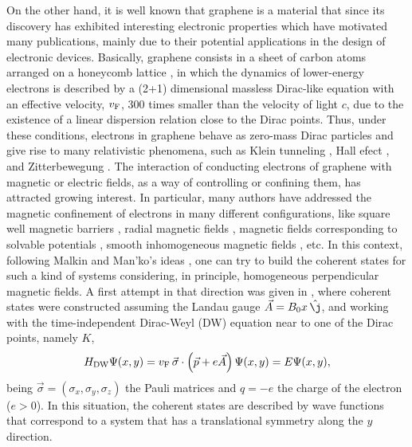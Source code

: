 \documentclass[aps,showpacs,showkeys]{revtex4}
\begin{document}
On the other hand, it is well known that graphene is a material that since its discovery has exhibited interesting electronic properties which have motivated many publications, mainly due to their potential applications in the design of electronic devices. Basically, graphene consists in a sheet of carbon atoms arranged on a honeycomb lattice \cite{ngmzd04,ztsk05,cngpn09}, in which the dynamics of lower-energy electrons is described by a (2+1) dimensional massless Dirac-like equation with an effective velocity, $v_{\rm F}$, 300 times smaller than the velocity of light $c$, due to the existence of a linear dispersion relation close to the Dirac points. Thus, under these conditions, electrons in graphene behave as zero-mass Dirac particles and give rise to many relativistic phenomena, such as Klein tunneling \cite{kng06}, Hall efect \cite{ngmzd04,cngpn09,s91}, and Zitterbewegung \cite{k06,rz07,rz08}. The interaction of conducting electrons of graphene with magnetic or electric fields, as a way of controlling or confining them, has attracted growing interest. In particular, many authors have addressed the magnetic confinement of electrons in many different configurations, like square well magnetic barriers \cite{dmdae07,dndm09}, radial magnetic fields \cite{gmr09}, magnetic fields corresponding to solvable potentials \cite{knn09,mf14}, smooth inhomogeneous magnetic fields \cite{rvp11,lara,dp16,cdmp16,ema17,rkb12,dnvhp17}, etc. In this context, following Malkin and Man'ko's ideas \cite{mm69}, one can try to build the coherent states for such a kind of systems considering, in principle, homogeneous perpendicular magnetic fields. A first attempt in that direction was given in \cite{df17}, where coherent states were constructed assuming the Landau gauge $\vec{A}=B_0x\,\hat{\j}$, and working with the time-independent Dirac-Weyl (DW) equation near to one of the Dirac points, namely $K$,
\begin{equation}\label{3}
	H_{\rm DW}\Psi(x,y)=v_{\rm F}\,\vec{\sigma}\cdot\left(\vec{p}+e\vec{A}\right)\Psi(x,y)=E\Psi(x,y),
\end{equation}
being $\vec{\sigma}=(\sigma_x,\sigma_y,\sigma_z)$ the Pauli matrices and $q=-e$ the charge of the electron ($e>0$). In this situation, the coherent states are described by wave functions that correspond to a system that has a translational symmetry along the $y$ direction. 
\end{document}
